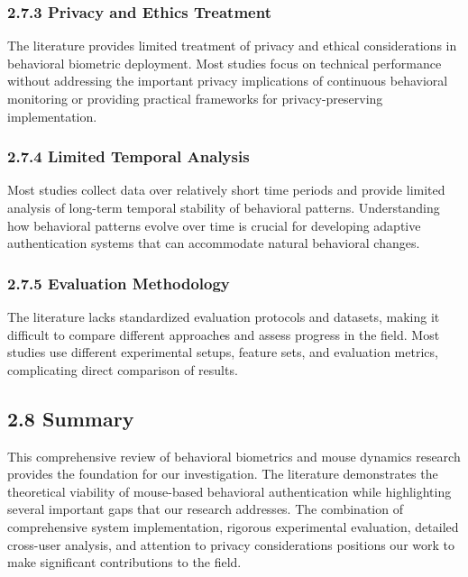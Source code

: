 \documentclass[
  11pt,
  a4paper,
]{article}
\begin{document}
\subsubsection{2.7.3 Privacy and Ethics
Treatment}\label{privacy-and-ethics-treatment}

The literature provides limited treatment of privacy and ethical
considerations in behavioral biometric deployment. Most studies focus on
technical performance without addressing the important privacy
implications of continuous behavioral monitoring or providing practical
frameworks for privacy-preserving implementation.

\subsubsection{2.7.4 Limited Temporal
Analysis}\label{limited-temporal-analysis}

Most studies collect data over relatively short time periods and provide
limited analysis of long-term temporal stability of behavioral patterns.
Understanding how behavioral patterns evolve over time is crucial for
developing adaptive authentication systems that can accommodate natural
behavioral changes.

\subsubsection{2.7.5 Evaluation
Methodology}\label{evaluation-methodology}

The literature lacks standardized evaluation protocols and datasets,
making it difficult to compare different approaches and assess progress
in the field. Most studies use different experimental setups, feature
sets, and evaluation metrics, complicating direct comparison of results.

\subsection{2.8 Summary}\label{summary-1}

This comprehensive review of behavioral biometrics and mouse dynamics
research provides the foundation for our investigation. The literature
demonstrates the theoretical viability of mouse-based behavioral
authentication while highlighting several important gaps that our
research addresses. The combination of comprehensive system
implementation, rigorous experimental evaluation, detailed cross-user
analysis, and attention to privacy considerations positions our work to
make significant contributions to the field.
\end{document}
